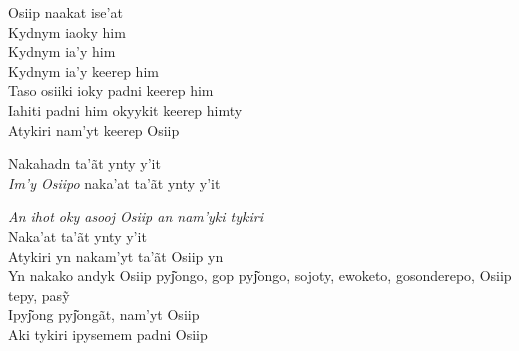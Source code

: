 \begin{linenumbers}\begingroup\raggedright
 
\noindent   Osiip naakat ise'at\\
  Kydnym iaoky him\\
  Kydnym ia'y him\\
  Kydnym ia'y keerep him\\
  Taso osiiki ioky padni keerep him\\
  Iahiti padni him okyykit keerep himty\\
  Atykiri nam'yt keerep Osiip
 
\end{linenumbers}\endgroup

\bigskip

\begin{linenumbers}\begingroup\raggedright
 
\noindent   Nakahadn ta'ãt ynty y'it\\
  \emph{Im'y Osiipo} naka'at ta'ãt ynty y'it
 
\end{linenumbers}\endgroup

\bigskip

\begin{linenumbers}\begingroup\raggedright
 
\noindent   \emph{An ihot oky asooj Osiip an nam'yki tykiri}\\
  Naka'at ta'ãt ynty y'it\\
  Atykiri yn nakam'yt ta'ãt Osiip yn\\
  Yn nakako andyk Osiip pyj͂ongo, gop pyj͂ongo, sojoty, ewoketo, gosonderepo, Osiip tepy, pasỹ\\
  Ipyj͂ong pyj͂ongãt, nam'yt Osiip\\
  Aki tykiri ipysemem padni Osiip
 
\end{linenumbers}\endgroup

